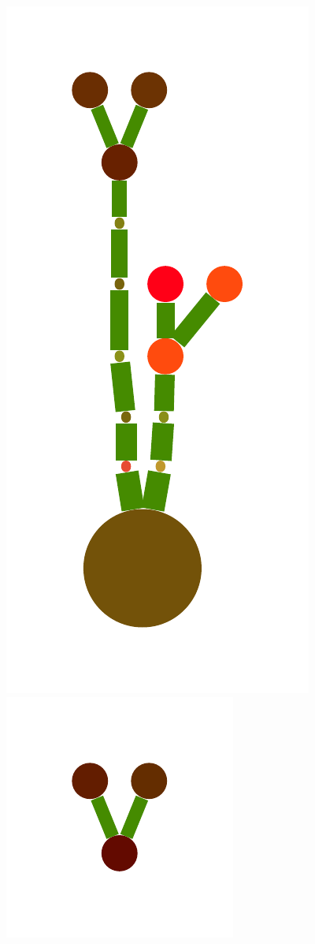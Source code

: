 \documentclass[a4paper,10pt]{article}
\begin{document}
\begin{figure}
{    \includegraphics[scale=.16]{./figures/6-5-tree-induced-17.pdf}
    \includegraphics[scale=.16]{./figures/6-5-tree-induced-18.pdf}
}
\end{figure}
\end{document}

